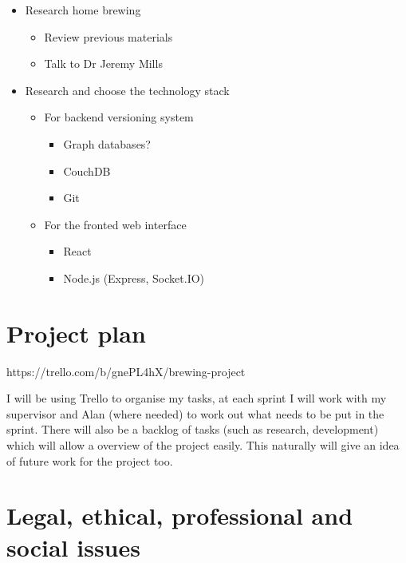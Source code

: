 \begin{itemize}
    \item Research home brewing
        \begin{itemize}
            \item Review previous materials
            \item Talk to Dr Jeremy Mills
        \end{itemize}
    \item Research and choose the technology stack
        \begin{itemize}
            \item For backend versioning system
            \begin{itemize}
                \item Graph databases?
                \item CouchDB
                \item Git
            \end{itemize}
        \end{itemize}
        \begin{itemize}
            \item For the fronted web interface
            \begin{itemize}
                \item React
                \item Node.js (Express, Socket.IO)
            \end{itemize}
        \end{itemize}
\end{itemize}

\section{Project plan}

https://trello.com/b/gnePL4hX/brewing-project

I will be using Trello to organise my tasks, at each sprint I will work with my supervisor and Alan (where needed) to work out what needs to be put in the sprint. There will also be a backlog of tasks (such as research, development) which will allow a overview of the project easily. This naturally will give an idea of future work for the project too.

\section{Legal, ethical, professional and social issues}

